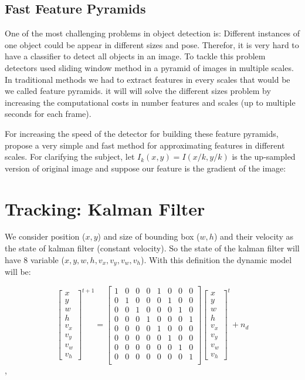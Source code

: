 \documentclass[conference]{IEEEtran}
\begin{document}
\subsection{Fast Feature Pyramids}
One of the most challenging problems in object detection is: Different instances of one object could be appear in different sizes and pose. Therefor, it is very hard to have a classifier to detect all objects in an image. To tackle this problem detectors used sliding window method in a pyramid of images in multiple scales. In traditional methods we had to extract features in every scales that would be we called feature pyramids. it will will solve the different sizes problem by increasing the computational costs in number features and scales (up to multiple seconds for each frame).

For increasing the speed of the detector for building these feature pyramids, \cite{dollar2014fast} propose a very simple and fast method for approximating features in different scales. For clarifying the subject, let $I_{k}(x,y)=I(x/k,y/k)$ is the up-sampled version of original image and suppose our feature is the gradient of the image: 

\section{Tracking: Kalman Filter}

We consider position ($x,y$) and size of bounding box ($w,h$) and their velocity as the state of kalman filter (constant velocity). So the state of the kalman filter will have 8 variable ($x,y,w,h,v_x,v_y,v_w,v_h$).
With this definition the dynamic model will be:

\[
\begin{bmatrix}
x \\
y \\
w \\
h \\
v_x \\
v_y \\
v_w \\
v_h
\end{bmatrix}^{t+1}
=
\begin{bmatrix}
1 &0 & 0 & 0  & 1 & 0 &0 &0 \\
0 &1 & 0 & 0  & 0 & 1 &0 &0 \\
0 &0 & 1 & 0  & 0 & 0 &1 &0 \\
0 &0 & 0 & 1  & 0 & 0 &0 &1 \\
0 &0 & 0 & 0  & 1 & 0 &0 &0 \\
0 &0 & 0 & 0  & 0 & 1 &0 &0 \\
0 &0 & 0 & 0  & 0 & 0 &1 &0 \\
0 &0 & 0 & 0  & 0 & 0 &0 &1 \\
\end{bmatrix}
\begin{bmatrix}
x \\
y \\
w \\
h \\
v_x \\
v_y \\
v_w \\
v_h
\end{bmatrix}^t+n_d
\],
\end{document}
